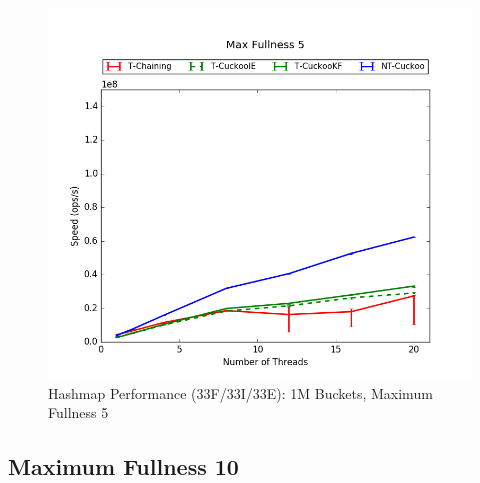 \begin{figure}[H]
    \centering
	\begin{minipage}{0.5\textwidth}\includegraphics[width=\textwidth]{maps/5HM1M:F34,I33,E33.png} 
    \end{minipage}
	\begin{minipage}{0.4\textwidth}
    
    \end{minipage}
    \caption{Hashmap Performance (33F/33I/33E): 1M Buckets, Maximum Fullness 5}
\end{figure}

\subsection{Maximum Fullness 10}

